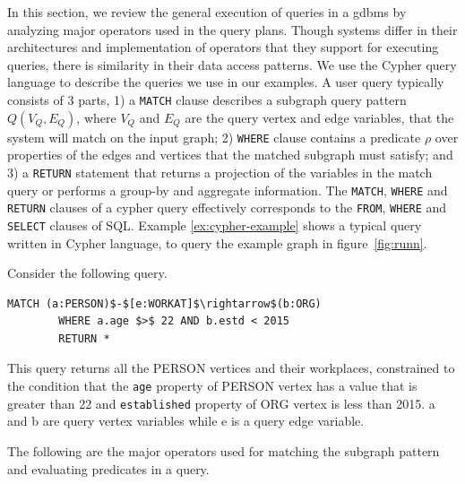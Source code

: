 In this section, we review the general execution of queries in a \gls{gdbms} by analyzing major operators used in the query plans. Though systems differ in their architectures and implementation of operators that they support for executing queries, there is similarity in their data access patterns. We use the Cypher query language \cite{cypher} to describe the queries we use in our examples. A user query typically consists of 3 parts, 1) a \texttt{MATCH} clause describes a subgraph query pattern $Q(V_Q, E_Q)$, where $V_Q$ and $E_Q$ are the query vertex and edge variables, that the system will match on the input graph; 2) \texttt{WHERE} clause contains a predicate $\rho$ over properties of the edges and vertices that the matched subgraph must satisfy; and 3) a \texttt{RETURN} statement that returns a projection of the variables in the match query or performs a group-by and aggregate information. The \texttt{MATCH}, \texttt{WHERE} and \texttt{RETURN} clauses of a cypher query effectively corresponds to the \texttt{FROM}, \texttt{WHERE} and \texttt{SELECT} clauses of SQL. Example \ref{ex:cypher-example} shows a typical query written in Cypher language, to query the example graph in figure~\ref{fig:runn}.
\begin{example}
	\vspace{19pt}
	\label{ex:cypher-example}
	Consider the following query. 
	{\em 
		\begin{lstlisting}[numbers=none,  showstringspaces=false,belowskip=0pt ]
		MATCH (a:PERSON)$-$[e:WORKAT]$\rightarrow$(b:ORG)
		WHERE a.age $>$ 22 AND b.estd < 2015
		RETURN *\end{lstlisting}
	}
	This query returns all the PERSON vertices and their workplaces, constrained to the condition that the \textsc{}\texttt{age}\textsc{} property of PERSON vertex has a value that is greater than 22 and \textsc{}\texttt{established}\textsc{} property of ORG vertex is less than 2015. a and b are query vertex variables while e is a query edge variable.
\end{example}
\vspace{-5pt}

The following are the major operators used for matching the subgraph pattern and evaluating predicates in a query.


